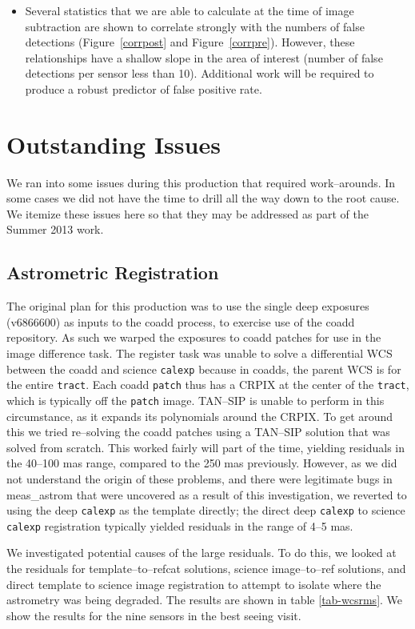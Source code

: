 \documentclass[prd, nofootinbib, floatfix, 11pt,tightenlines,times]{article}
\begin{document}
\begin{itemize}
\item Several statistics that we are able to calculate at the time of
  image subtraction are shown to correlate strongly with the numbers
  of false detections (Figure~\ref{corrpost} and
  Figure~\ref{corrpre}).  However, these relationships have a shallow
  slope in the area of interest (number of false detections per sensor
  less than 10).  Additional work will be required to produce a robust
  predictor of false positive rate.


\end{itemize}

\section{Outstanding Issues}
We ran into some issues during this production that required work--arounds.  
In some cases we did not have the time to drill all the way down
to the root cause.  We itemize these issues here so that they may be addressed 
as part of the Summer 2013 work.


\subsection{Astrometric Registration \label{subsec-astrom}}
The original plan for this production was to use the single deep exposures (v6866600) as 
inputs to the coadd process, to exercise use of the coadd repository.  As 
such we warped the exposures to coadd patches for use in the image difference
task.  The register task was unable to solve a differential WCS between the coadd
and science {\tt calexp} because in coadds, the parent WCS is for the entire {\tt tract}.
Each coadd {\tt patch} thus has a CRPIX at the center of the {\tt tract}, which is
typically off the {\tt patch} image.  TAN--SIP is unable to perform in this circumstance,
as it expands its polynomials around the CRPIX.  To get around this 
we tried re--solving the coadd patches using a TAN--SIP solution that was solved from
scratch.  This worked fairly will part of the time,
yielding residuals in the 40--100 mas range, compared to the 250 mas previously.  However,
as we did not understand the origin of these problems, and there were legitimate bugs
in meas\_astrom  that were uncovered as a result of this investigation, we reverted to
using the deep {\tt calexp} as the template directly; the direct deep {\tt calexp} to science {\tt calexp} 
registration typically yielded residuals in the range of 4--5 mas.

We investigated potential causes of the large residuals.  To do this, we looked at the 
residuals for template--to--refcat solutions, science image--to--ref solutions, and 
direct template to science image registration to attempt to isolate where the astrometry 
was being degraded.  The results are shown
in table \ref{tab-wcsrms}.  We show the results for the nine sensors in the best seeing visit.  
\end{document}
